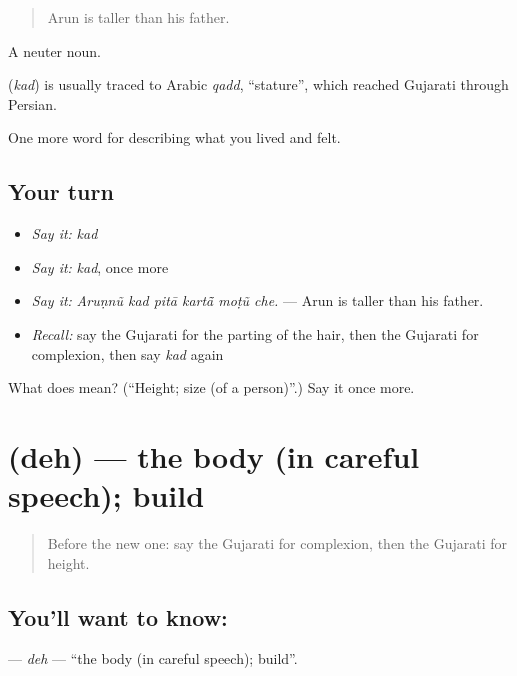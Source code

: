 \begin{quote}
Arun is taller than his father.
\end{quote}

A neuter noun.

\begin{cousinweb}
\textbf{} (\emph{kad}) is usually traced to Arabic \emph{qadd}, \textquotedblleft{}stature\textquotedblright{}, which reached Gujarati through Persian.
\end{cousinweb}

\begin{grammarlens}[title={What you've built}]
One more word for describing what you lived and felt.
\end{grammarlens}

\subsection*{Your turn}
\begin{itemize}
\raggedright
  \item \emph{Say it:} \emph{kad}
  \item \emph{Say it:} \emph{kad}, once more
  \item \emph{Say it:} \emph{Aruṇnũ kad pitā kartā̃ moṭũ che.} — Arun is taller than his father.
  \item \emph{Recall:} say the Gujarati for the parting of the hair, then the Gujarati for complexion, then say \emph{kad} again
\end{itemize}

\begin{tcolorbox}[breakable,colback=teal!4,colframe=teal!35!black,title={Before you move on}]
What does  mean? (\textquotedblleft{}Height; size (of a person)\textquotedblright{}.) Say it once more.
\end{tcolorbox}
\section[\texorpdfstring{\gu{દેહ} (deh)}{દેહ (deh)}]{ (deh) — the body (in careful speech); build}

\label{lesson:GU-C471-deh}



\begin{quote}
Before the new one: say the Gujarati for complexion, then the Gujarati for height.
\end{quote}

\subsection*{You'll want to know: }
\textbf{} — \emph{deh} — \textquotedblleft{}the body (in careful speech); build\textquotedblright{}.

